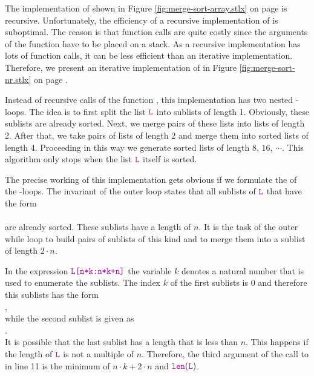 \noindent
The implementation of  shown in Figure \ref{fig:merge-sort-array.stlx} on page
\pageref{fig:merge-sort-array.stlx} is recursive.  Unfortunately, the efficiency of a recursive
implementation of  is suboptimal.  The reason is that function calls are quite
costly since the arguments of the function have to be placed on a stack.  As a recursive
implementation has lots of function calls, it can be less efficient than an iterative
implementation.  Therefore, we present an iterative implementation of  in Figure
\ref{fig:merge-sort-nr.stlx} on page \pageref{fig:merge-sort-nr.stlx}.

Instead of recursive calls of the function , this implementation has two nested 
-loops.  The idea is to first split the list $\mytt{L}$ into sublists of length 1.
Obviously, these sublists are already sorted.  Next, we merge pairs of these lists into lists of
length 2.  After that, we take pairs of lists of length 2 and merge them into sorted lists of length
4. Proceeding in this way we generate sorted lists of length
$8$, $16$, $\cdots$.  This algorithm only stops when the list $\mytt{L}$ itself is sorted.

The precise working of this implementation gets obvious if we formulate the  of the
-loops.  The invariant of the outer loop states that all sublists of $\mytt{L}$ 
that have the form
\\[0.2cm]
\hspace*{1.3cm}
\\[0.2cm]
are already sorted.  These sublists have a length of $n$.  It is the task of the outer while loop to build
pairs of sublists of this kind and to merge them into a sublist of length $2 \cdot n$.

In the expression $\mytt{L[n*k:n*k+n]}$ the variable $k$ denotes a natural
number that is used to enumerate the sublists.  The index $k$ of the first sublists is $0$ and
therefore this sublists has the form
\\[0.2cm]
\hspace*{1.3cm}
,
\\[0.2cm]
while the second sublist is given as
\\[0.2cm]
\hspace*{1.3cm}
.
\\[0.2cm]
It is possible that the last sublist has a length that is less than $n$.  This happens if the length
of $\mytt{L}$ is not a multiple of $n$.  Therefore, the third argument of the call to 
in line 11 is the minimum of $n\cdot k + 2\cdot n$ and $\mytt{len}(\mytt{L})$.


